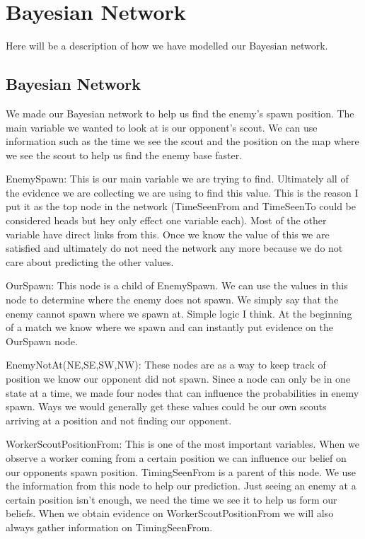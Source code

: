 \section{Bayesian Network}\label{bayesian_network}

Here will be a description of how we have modelled our Bayesian network.

\subsection*{Bayesian Network}			 
			
We made our Bayesian network to help us find the enemy's spawn position. The main variable we wanted to look at is our opponent's scout. We can use information such as the time we see the scout and the position on the map where we see the scout to help us find the enemy base faster. 

EnemySpawn: This is our main variable we are trying to find. Ultimately all of the evidence we are collecting we are using to find this value. This is the reason I put it as the top node in the network (TimeSeenFrom and TimeSeenTo could be considered heads but hey only effect one variable each). Most of the other variable have direct links from this. Once we know the value of this we are satisfied and ultimately do not need the network any more because we do not care about predicting the other values.

OurSpawn: This node is a child of EnemySpawn. We can use the values in this node to determine where the enemy does not spawn. We simply say that the enemy cannot spawn where we spawn at. Simple logic I think. At the beginning of a match we know where we spawn and can instantly put evidence on the OurSpawn node.
 
EnemyNotAt(NE,SE,SW,NW): These nodes are as a way to keep track of position we know our opponent did not spawn. Since a node can only be in one state at a time, we made four nodes that can influence the probabilities in enemy spawn. Ways we would generally get these values could be our own scouts arriving at a position and not finding our opponent.

WorkerScoutPositionFrom: This is one of the most important variables. When we observe a worker coming from a certain position we can influence our belief on our opponents spawn position. TimingSeenFrom is a parent of this node. We use the information from this node to help our prediction. Just seeing an enemy at a certain position isn't enough, we need the time we see it to help us form our beliefs. When we obtain evidence on WorkerScoutPositionFrom we will also always gather information on TimingSeenFrom.

